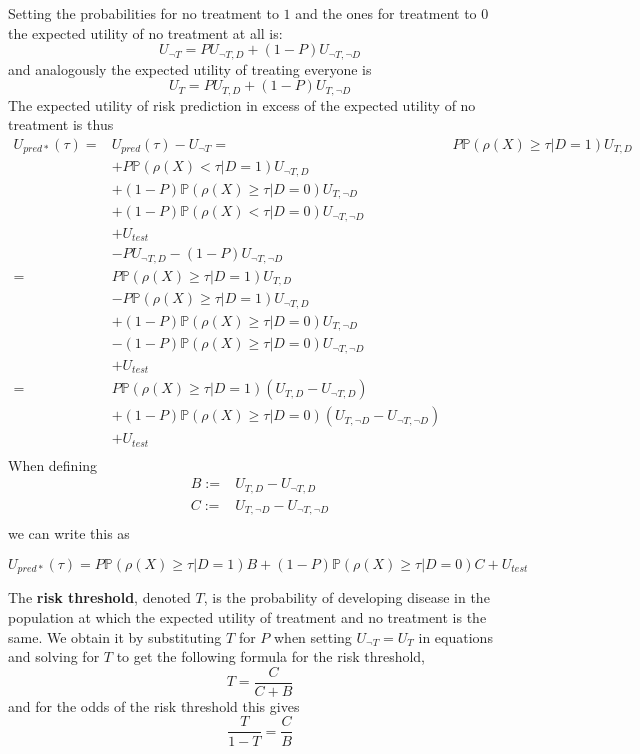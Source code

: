 	Setting the probabilities for no treatment to $1$ and the ones for treatment to $0$ the expected utility of no treatment at all is:
	\[
		U_{\neg T} =  P  U_{\neg T, D}+ (1 - P)  U_{\neg T, \neg D}
	\]
	and analogously the expected utility of treating everyone is
	\[
		U_{ T} =  P  U_{T, D} + (1 - P)  U_{T, \neg D}
	\]
	The expected utility of risk prediction in excess of the expected utility of no treatment is thus
	\[
	\begin{aligned}
		U_{pred*}(\tau) =& U_{pred}(\tau) - U_{\neg T}
		=& P \mathbb{P}(\rho(X) \geq \tau | D = 1) U_{T, D}\\
    		&+ P \mathbb{P}(\rho(X) < \tau | D = 1) U_{\neg T, D}\\
		&+ (1 - P) \mathbb{P}(\rho(X) \geq \tau | D = 0) U_{T, \neg D}\\
		&+ (1 - P) \mathbb{P}(\rho(X) < \tau | D = 0) U_{\neg T, \neg D}\\
		&+ U_{test} \\
		&- P  U_{\neg T, D} - (1 - P)  U_{\neg T, \neg D} \\
		=& P \mathbb{P}(\rho(X) \geq \tau | D = 1) U_{T, D}\\
		&- P \mathbb{P}(\rho(X) \geq \tau | D = 1) U_{\neg T, D}\\
		&+ (1 - P) \mathbb{P}(\rho(X) \geq \tau | D = 0) U_{T, \neg D}\\
		&- (1 - P) \mathbb{P}(\rho(X) \geq \tau | D = 0) U_{\neg T, \neg D}\\
		&+ U_{test} \\
		=& P \mathbb{P}(\rho(X) \geq \tau | D = 1) (U_{T, D} - U_{\neg T, D})\\\
		&+ (1 - P) \mathbb{P}(\rho(X) \geq \tau | D = 0) (U_{T, \neg D} - U_{\neg T, \neg D})\\
		&+ U_{test} \\
	\end{aligned}
	\]
	When defining
	\[
	\begin{aligned}
		B :=&  U_{T, D} - U_{\neg T, D} \\
		C :=&  U_{T, \neg D} - U_{\neg T, \neg D} \\
	\end{aligned}
	\]
	we can write this as
	
	\[
		U_{pred*}(\tau) = P \mathbb{P}(\rho(X) \geq \tau | D = 1) B + (1 - P) \mathbb{P}(\rho(X) \geq \tau | D = 0) C + U_{test}
	\]
	
	The \textbf{risk threshold}, denoted $T$, is the probability of developing disease in the population at which the expected utility of treatment and no treatment is the same.
	We obtain it by substituting $T$ for $P$ when setting $U_{\neg T} = U_{T}$ in equations and solving for $T$ to get the following formula for the risk threshold, 
	\[
		T =  \frac{C}{C + B}
	\]
	and for the odds of the risk threshold this gives
	\[
		 \frac{T}{1 - T} =  \frac{C}{B}
	\]


